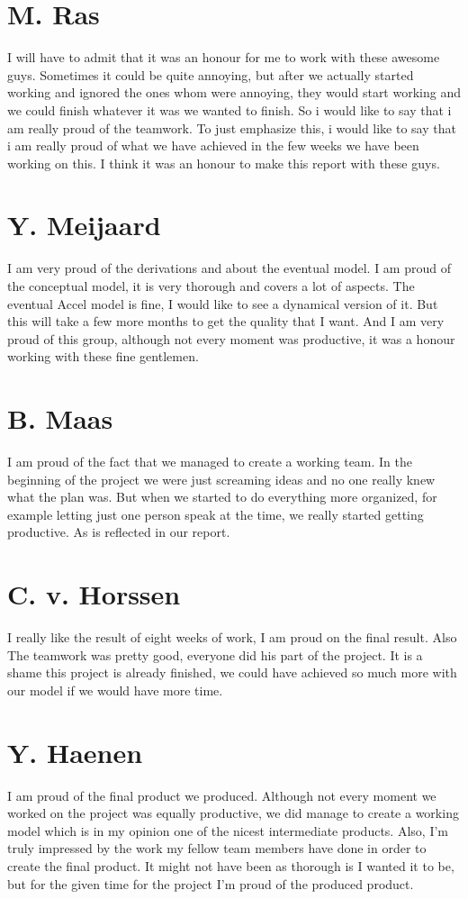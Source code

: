 \documentclass[a4paper, 11pt, notitlepage]{report}
\begin{document}
	\section*{M. Ras}I will have to admit that it was an honour for me to work with these awesome guys. Sometimes it could be quite annoying, but after we actually started working and ignored the ones whom were annoying, they would start working and we could finish whatever it was we wanted to finish. So i would like to say that i am really proud of the teamwork. To just emphasize this, i would like to say that i am really proud of what we have achieved in the few weeks we have been working on this. I think it was an honour to make this report with these guys.
	
	\section*{Y. Meijaard} I am very proud of the derivations and about the eventual model. I am proud of the conceptual model, it is very thorough and covers a lot of aspects. The eventual Accel model is fine, I would like to see a dynamical version of it. But this will take a few more months to get the quality that I want. And I am very proud of this group, although not every moment was productive, it was a honour working with these fine gentlemen.
	
	\section*{B. Maas} I am proud of the fact that we managed to create a working team. In the beginning of the project we were just screaming ideas and no one really knew what the plan was. But when we started to do everything more organized, for example letting just one person speak at the time, we really started getting productive. As is reflected in our report.

\section*{C. v. Horssen} I really like the result of eight weeks of work, I am proud on the final result. Also The teamwork was pretty good, everyone did his part of the project. It is a shame this project is already finished, we could have achieved so much more with our model if we would have more time.

\section*{Y. Haenen}
I am proud of the final product we produced. Although not every moment we worked on the project was equally productive, we did manage to create a working model which is in my opinion one of the nicest intermediate products. Also, I'm truly impressed by the work my fellow team members have done in order to create the final product. It might not have been as thorough is I wanted it to be, but for the given time for the project I'm proud of the produced product.
\end{document}

